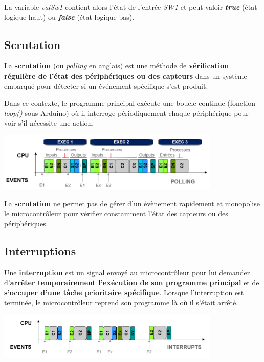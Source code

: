 \documentclass[a4paper,11pt,titlepage]{article} %
\begin{document}
La variable \textsl{valSw1} contient alors l'état de l'entrée \textsl{SW1} et peut valoir \textit{\textbf{true}} (état logique haut) ou \textit{\textbf{false}} (état logique bas).

\subsection{Scrutation}

La \textbf{scrutation} (ou \textit{polling} en anglais) est une méthode de \textbf{vérification régulière de l'état des périphériques ou des capteurs} dans un système embarqué pour détecter si un événement spécifique s'est produit. 

Dans ce contexte, le programme principal exécute une boucle continue (fonction \textsl{loop()} sous Arduino) où il interroge périodiquement chaque périphérique pour voir s'il nécessite une action. 

\begin{center}
	\includegraphics[width=0.8\textwidth]{images/gen_polling.png}
\end{center}

La \textbf{scrutation} ne permet pas de gérer d'un évènement rapidement et monopolise le microcontrôleur pour vérifier constamment l'état des capteurs ou des périphériques.


\subsection{Interruptions}

Une \textbf{interruption} est un signal envoyé au microcontrôleur pour lui demander d'\textbf{arrêter temporairement l'exécution de son programme principal} et de \textbf{s'occuper d'une tâche prioritaire spécifique}. Lorsque l'interruption est terminée, le microcontrôleur reprend son programme là où il s'était arrêté.

\begin{center}
	\includegraphics[width=0.8\textwidth]{images/gen_isr.png}
\end{center}
\end{document}
